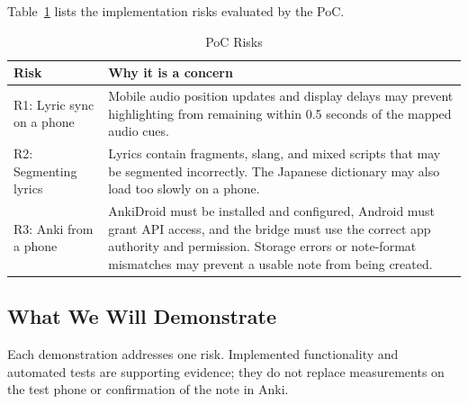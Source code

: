 \documentclass{article}
\begin{document}
Table~\ref{TblRisks} lists the implementation risks evaluated by the PoC.

\begin{table}[h!]
\caption{PoC Risks} \label{TblRisks}
\begin{tabularx}{\textwidth}{lX}
\toprule
\textbf{Risk} & \textbf{Why it is a concern}\\
\midrule
R1: Lyric sync on a phone & Mobile audio position updates and display delays may prevent highlighting from remaining within 0.5 seconds of the mapped audio cues.\\
R2: Segmenting lyrics & Lyrics contain fragments, slang, and mixed scripts that may be segmented incorrectly. The Japanese dictionary may also load too slowly on a phone.\\
R3: Anki from a phone & AnkiDroid must be installed and configured, Android must grant API access, and the bridge must use the correct app authority and permission. Storage errors or note-format mismatches may prevent a usable note from being created.\\
\bottomrule
\end{tabularx}
\end{table}

\subsection{What We Will Demonstrate}

Each demonstration addresses one risk. Implemented functionality and automated
tests are supporting evidence; they do not replace measurements on the test
phone or confirmation of the note in Anki.
\end{document}
